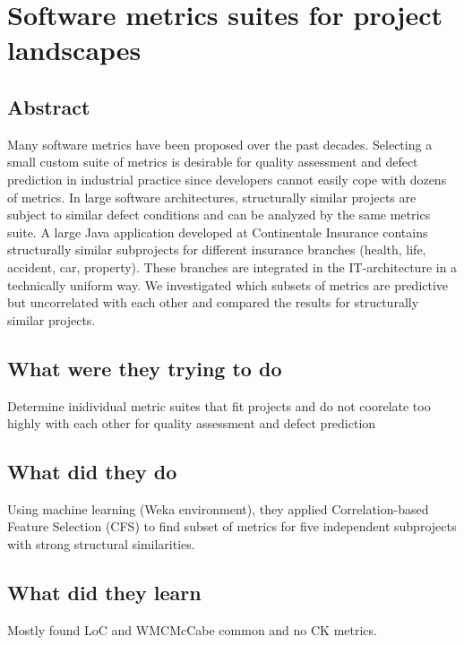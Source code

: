 \section{Software metrics suites for project landscapes}

\subsection{Abstract}

Many software metrics have been proposed over the past decades. Selecting a small custom suite of metrics is desirable for quality assessment and defect prediction in industrial practice since developers cannot easily cope with dozens of metrics. In large software architectures, structurally similar projects are subject to similar defect conditions and can be analyzed by the same metrics suite. A large Java application developed at Continentale Insurance contains structurally similar subprojects for different insurance branches (health, life, accident, car, property). These branches are integrated in the IT-architecture in a technically uniform way. We investigated which subsets of metrics are predictive but uncorrelated with each other and compared the results for structurally similar projects.

\subsection{What were they trying to do}

Determine inidividual metric suites that fit projects and do not coorelate too highly with each other for quality assessment and defect prediction

\subsection{What did they do}

Using machine learning (Weka environment), they applied Correlation-based Feature Selection (CFS) to find subset of metrics for five independent subprojects with strong structural similarities.

\subsection{What did they learn}

Mostly found LoC and WMCMcCabe common and no CK metrics.

